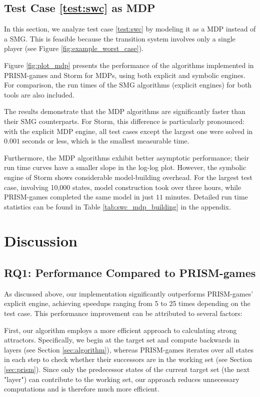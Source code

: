 \subsection{Test Case \ref{test:swc} as MDP}

In this section, we analyze test case \ref{test:swc} by modeling it as a MDP instead of a SMG. This is feasible because the transition system involves only a single player (see Figure \ref{fig:example_worst_case}).



Figure \ref{fig:plot_mdp} presents the performance of the algorithms implemented in PRISM-games and Storm for MDPs, using both explicit and symbolic engines. For comparison, the run times of the SMG algorithms (explicit engines) for both tools are also included.

The results demonstrate that the MDP algorithms are significantly faster than their SMG counterparts. For Storm, this difference is particularly pronounced: with the explicit MDP engine, all test cases except the largest one were solved in $0.001$ seconds or less, which is the smallest measurable time. 

Furthermore, the MDP algorithms exhibit better asymptotic performance; their run time curves have a smaller slope in the log-log plot. However, the symbolic engine of Storm shows considerable model-building overhead. For the largest test case, involving 10,000 states, model construction took over three hours, while PRISM-games completed the same model in just $11$ minutes. Detailed run time statistics can be found in Table \ref{tab:swc_mdp_building} in the appendix.

\section{Discussion}
\label{sec:discussion}

\subsection{\textbf{RQ1}: Performance Compared to PRISM-games}
As discussed above, our implementation significantly outperforms PRISM-games' explicit engine, achieving speedups ranging from 5 to 25 times depending on the test case. This performance improvement can be attributed to several factors:

First, our algorithm employs a more efficient approach to calculating strong attractors. Specifically, we begin at the target set and compute backwards in layers (see Section \ref{sec:algorithm}), whereas PRISM-games iterates over all states in each step to check whether their successors are in the working set (see Section \ref{sec:prism}). Since only the predecessor states of the current target set (the next "layer") can contribute to the working set, our approach reduces unnecessary computations and is therefore much more efficient.

